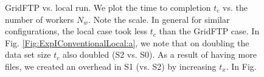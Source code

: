 \documentclass{rspublic}
\begin{document}
\begin{figure}[!ht]
\begin{center}
\caption{GridFTP vs. local run. We plot the time to completion $t_c$
  vs. the number of workers $N_w$. Note the scale. In general for
  similar configurations, the local case took less $t_c$ than the
  GridFTP case. In Fig.  \ref{Fig:ExpIConventionalLocal:a}, we note
  that on doubling the data set size $t_c$ also doubled (S2
  vs. S0). As a result of having more files, we created an overhead in
  S1 (vs. S2) by increasing $t_x$. In Fig.
}
\end{center}
\end{figure}
\end{document}
